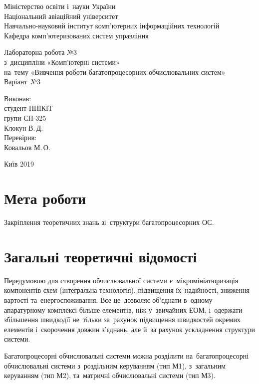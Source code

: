 \documentclass[
	a4paper,
	oneside,
	BCOR = 10mm,
	DIV = 12,
	12pt,
	headings = normal,
]{scrartcl}
\newcommand{\allcaps}[1]{{\addfontfeatures{LetterSpace = 8, Kerning = Off}#1}}
\begin{document}
\begin{titlepage}
		\begin{center}
			Міністерство освіти і~науки України\\
			Національний авіаційний університет\\
			Навчально-науковий інститут комп'\-ютерних інформаційних технологій\\
			Кафедра комп'\-ютеризованих систем управління

			\vspace{\fill}
				Лабораторна робота №3\\
				з~дисципліни «Комп'\-ютерні системи»\\
				на~тему «Вивчення роботи багатопроцесорних обчислювальних систем»\\
				Варіант~№3

			\vspace{\fill}

			\begin{flushright}
				Виконав:\\
				студент \allcaps{ННІКІТ}\\
				групи СП-325\\
				Клокун В.\,Д.\\
				Перевірив:\\
				Ковальов М.\,О.
			\end{flushright}

			Київ 2019
		\end{center}
	\end{titlepage}

	\section{Мета роботи}
		Закріплення теоретичних знань зі~структури багатопроцесорних ОС.

	\section{Загальні теоретичні відомості}
		Передумовою для створення обчислювальної системи є~мікромініатюризація компонентів схем (інтегральна технологія), підвищення їх~надійності, зниження вартості та~енергоспоживання. Все це~дозволяє об’єднати в~одному апаратурному комплексі більше елементів, ніж у~звичайних ЕОМ, і~одержати збільшення швидкодії не~тільки за~рахунок підвищення швидкостей окремих елементів і~скорочення довжин з’єднань, але й~за рахунок ускладнення структури системи.

		Багатопроцесорні обчислювальні системи можна розділити на~багатопроцесорні обчислювальні системи з~роздільним керуванням (тип М1), з~загальним керуванням (тип М2), та~матричні обчислювальні системи (тип М3).
\end{document}
